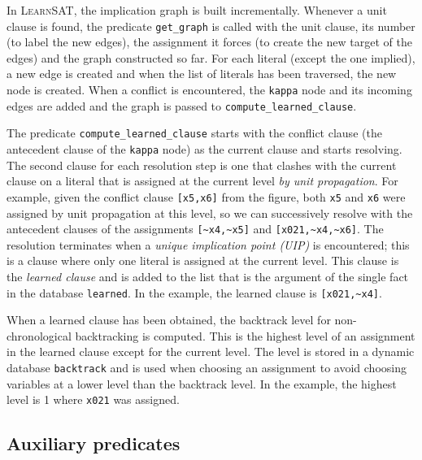 \documentclass[11pt]{article}
\newcommand*{\p}[1]{\textup{\texttt{#1}}}
\newcommand*{\ls}{\textsc{LearnSAT}}
\begin{document}
In \ls{}, the implication graph is built incrementally. Whenever a unit
clause is found, the predicate \p{get\_graph} is called with the unit
clause, its number (to label the new edges), the assignment it forces
(to create the new target of the edges) and the graph constructed so
far. For each literal (except the one implied), a new edge is created
and when the list of literals has been traversed, the new node is
created. When a conflict is encountered, the \p{kappa} node and its
incoming edges are added and the graph is passed to
\p{compute\_learned\_clause}.

The predicate \p{compute\_learned\_clause} starts with the conflict
clause (the antecedent clause of the \p{kappa} node) as the current
clause and starts resolving. The second clause for each resolution step
is one that clashes with the current clause on a literal that is
assigned at the current level \emph{by unit propagation}. For example,
given the conflict clause \p{[x5,x6]} from the figure, both \p{x5} and
\p{x6} were assigned by unit propagation at this level, so we can
successively resolve with the antecedent clauses of the assignments
\verb+[~x4,~x5]+ and \verb+[x021,~x4,~x6]+. The resolution terminates
when a \emph{unique implication point (UIP)} is encountered; this is a
clause where only one literal is assigned at the current level. This
clause is the \emph{learned clause} and is added to the list that is the
argument of the single fact in the database \p{learned}. In the example,
the learned clause is \verb+[x021,~x4]+.

When a learned clause has been obtained, the backtrack level for
non-chronological backtracking is computed. This is the highest level of
an assignment in the learned clause except for the current level. The
level is stored in a dynamic database \p{backtrack} and is used when
choosing an assignment to avoid choosing variables at a lower level than
the backtrack level. In the example, the highest level is 1 where
\p{x021} was assigned.


\pagebreak[4]

\subsection{Auxiliary predicates}
\end{document}
